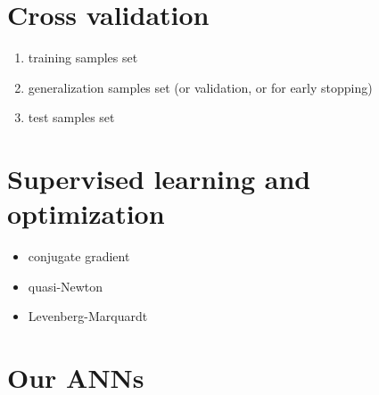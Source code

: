 \section{Cross validation}
\label{sec:crossvalidation}

\begin{enumerate}
  \item{training samples set}
  \item{generalization samples set (or validation, or for early stopping)}
  \item{test samples set}
\end{enumerate}

\section{Supervised learning and optimization}
\label{sec:supervisedlearningandoptimization}

\begin{itemize}
  \item{conjugate gradient }
  \item{quasi-Newton}
  \item{Levenberg-Marquardt}
\end{itemize}

\section{Our ANNs}
\label{sec:ouranns}


